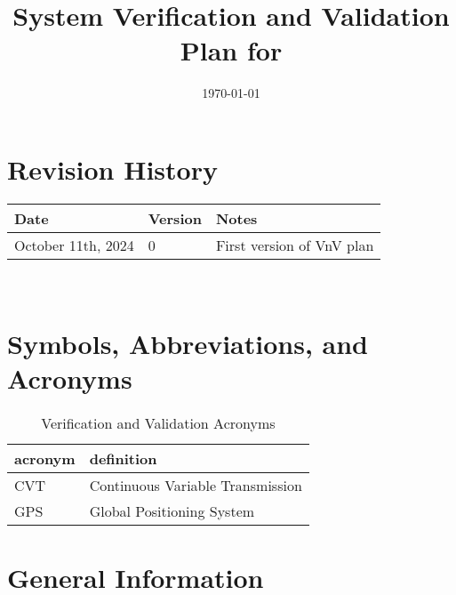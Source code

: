 \documentclass[12pt, titlepage]{article}
\begin{document}
\title{System Verification and Validation Plan for \progname{}} 
\author{\authname}
\date{\today}
	
\maketitle


\section*{Revision History}

\begin{tabularx}{\textwidth}{p{3cm}p{2cm}X}
\toprule {\bf Date} & {\bf Version} & {\bf Notes}\\
\midrule
October 11th, 2024 & 0 & First version of VnV plan\\
\bottomrule
\end{tabularx}

~\\

\newpage

\tableofcontents

\listoftables


\listoffigures


\newpage

\section{Symbols, Abbreviations, and Acronyms}

\begin{table}[h]
  \raggedright
  \begin{tabular}{l l} 
    \toprule		
    \textbf{acronym} & \textbf{definition}\\
    \midrule
    CVT & Continuous Variable Transmission\\
    GPS & Global Positioning System\\
    \bottomrule
  \end{tabular}
  \caption{Verification and Validation Acronyms}
  \label{tab:vnv_acronyms}
\end{table}

\newpage


\section{General Information}
\end{document}
